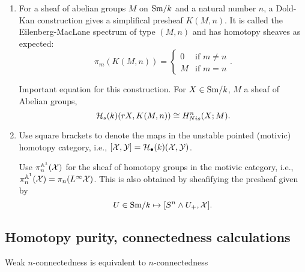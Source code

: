 \documentclass{amsart}%
\begin{document}
\begin{enumerate}
\begin{proposition}
  Let $\calX$ be a $0$-connected simplicial sheaf. Then
  $L^{\infty}\calX$ is also $0$-connected.
\end{proposition}

\begin{proof}
  M.V. IHES paper? Sketch of argument? It shouldn't be too hard by
  chasing components around.
\end{proof}

  \item For a sheaf of abelian groups $M$ on $\mathrm{Sm}/k$ and a natural
number $n$, a Dold-Kan construction gives a simplifical presheaf
$K(M,n)$. It is called the Eilenberg-MacLane spectrum of type $(M,n)$
and has homotopy sheaves as expected:
\begin{equation*}
  \pi_m(K(M,n)) = \begin{cases}0 & \text{if }m\neq n \\ M & \text{if } m = n \end{cases}.
\end{equation*}

Important equation for this construction. For $X\in\mathrm{Sm}/k$, $M$ a sheaf
of Abelian groups, 
  \begin{equation*}
    \mathcal{H}_s(k)(rX, K(M,n)) \cong H^n_{Nis}(X; M).
  \end{equation*}

    \item Use square brackets to denote the maps in the unstable
  pointed (motivic) homotopy category, i.e.,
  $[\mathcal{X}, \mathcal{Y}] = \mathcal{H}_{\bullet}(k)(\mathcal{X}, \mathcal{Y})$. 

  Use $\pi_n^{\mathbb{A}^1}(\mathcal{X})$ for the sheaf of homotopy
  groups in the motivic category, i.e.,
  $\pi^{\mathbb{A}^1}_n(\mathcal{X}) =
  \pi_n(L^{\infty}\mathcal{X})$.
  This is also obtained by sheafifying the presheaf given by 
  \begin{equation*}
    U \in \mathrm{Sm}/k \mapsto [S^n\wedge U_+, \mathcal{X}].
  \end{equation*}

\end{enumerate}

\subsection{Homotopy purity, connectedness calculations}

\begin{proposition}
  Weak $n$-connectedness is equivalent to $n$-connectedness
\end{proposition}
\end{document}
